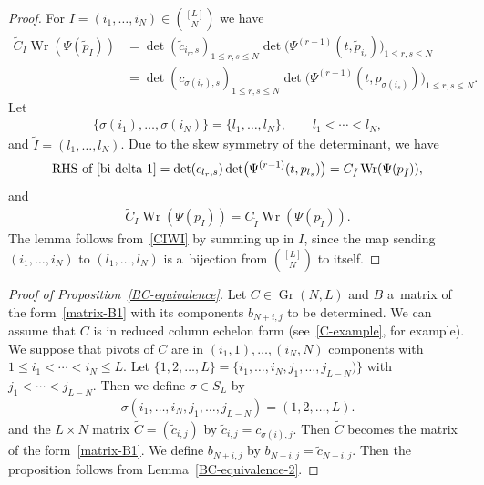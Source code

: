 \documentclass[10pt,a4paper]{amsart}
\numberwithin{equation}{section}
\theoremstyle{definition}
\begin{document}
\begin{proof}
For $I=(i_1,\dots ,i_N)\in\binom{[L]}{N}$ we have
\begin{align}
\tilde{C}_I\operatorname{Wr}(\Psi(\tilde{p}_I))
&=
\det(\tilde{c}_{i_r,s})_{1\leq r,s\leq N}
\det\bigl(\Psi^{(r-1)}(t,\tilde{p}_{i_s})\bigr)_{1\leq r,s\leq N}
\nonumber
\\
&=
\det(c_{\sigma(i_r),s})_{1\leq r,s\leq N}
\det\bigl(\Psi^{(r-1)}(t,p_{\sigma(i_s)})\bigr)_{1\leq r,s\leq N}.
\label{bi-delta-1}
\end{align}
Let
\begin{gather*}
\{\sigma(i_1),\dots ,\sigma(i_N)\}=\{l_1,\dots ,l_N\},
\qquad
l_1<\cdots<l_N,
\end{gather*}
 and $\tilde{I}=(l_1,\dots ,l_N)$.
Due to the skew symmetry of the determinant, we have
\[%
\text{RHS of~\eqref{bi-delta-1}}
=
\det(c_{l_r,s})
\det\bigl(\Psi^{(r-1)}(t,{p}_{l_s})\bigr)
=
C_{\tilde{I}}
\operatorname{Wr}(\Psi(p_{\tilde{I}})),
\]
and
\begin{gather}
\tilde{C}_I\operatorname{Wr}(\Psi(p_I))=C_{\tilde{I}}
\operatorname{Wr}(\Psi(p_{\tilde{I}})).
\label{CIWI}
\end{gather}
The lemma follows from~\eqref{CIWI} by summing up in $I$,
since the map sending $(i_1,\dots ,i_N)$ to $(l_1,\dots ,l_N)$ is a~bijection from $\binom{[L]}{N}$ to itself.
\end{proof}



\begin{proof}[Proof of Proposition~\ref{BC-equivalence}]

Let $C\in \operatorname{Gr}(N,L)$ and $B$ a~matrix of the form~\eqref{matrix-B1} with
its components $b_{N+i,j}$ to be determined.
We can assume that $C$ is in reduced column echelon form
(see~\eqref{C-example}, for example).
We suppose that pivots of $C$ are in $(i_1,1),\dots ,(i_N,N)$ components with
$1\leq i_1<\cdots<i_N\leq L$.
Let $\{1,2,\dots ,L\}=\{i_1,\dots ,i_N,j_1,\dots ,j_{L-N})\}$ with $j_1<\cdots<j_{L-N}$.
Then we define $\sigma\in S_L$ by
\begin{gather*}
\sigma(i_1,\dots ,i_N,j_1,\dots ,j_{L-N})=(1,2,\dots ,L).
\end{gather*}
and the $L\times N$ matrix $\tilde{C}=(\tilde{c}_{i,j})$ by
$
\tilde{c}_{i,j}=c_{\sigma(i),j}$.
Then $\tilde{C}$ becomes the matrix of the form~\eqref{matrix-B1}.
We define $b_{N+i,j}$ by
$
b_{N+i,j}=\tilde{c}_{N+i,j}$.
Then the proposition follows from Lemma~\ref{BC-equivalence-2}.
\end{proof}
\end{document}
